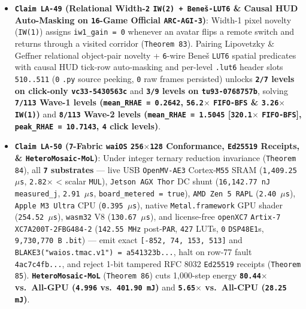 \documentclass[10pt]{article}
\begin{document}
\begin{itemize}
  \item \textbf{\texttt{Claim LA-49} (Relational Width-\texttt{2} \texttt{IW(2) + Bene\v{s}-LUT6} \& Causal HUD Auto-Masking on \texttt{16}-Game Official \texttt{ARC-AGI-3})}: Width-1 pixel novelty (\texttt{IW(1)}) assigns \texttt{iw1\_gain = 0} whenever an avatar flips a remote switch and returns through a visited corridor (\texttt{Theorem 83}). Pairing Lipovetzky \& Geffner relational object-pair novelty + \texttt{6}-wire Bene\v{s} \texttt{LUT6} spatial predicates with causal HUD tick-row auto-masking and per-level \texttt{.lut6} header slots \texttt{510..511} (\texttt{0} \texttt{.py} source peeking, \texttt{0} raw frames persisted) unlocks \textbf{\texttt{2/7} levels on click-only \texttt{vc33-5430563c}} and \textbf{\texttt{3/9} levels on \texttt{tu93-0768757b}}, solving \textbf{\texttt{7/113} Wave-1 levels (\texttt{mean\_RHAE = 0.2642}, \texttt{56.2$\times$} \texttt{FIFO-BFS} \& \texttt{3.26$\times$} \texttt{IW(1)})} and \textbf{\texttt{8/113} Wave-2 levels (\texttt{mean\_RHAE = 1.5045} [\texttt{320.1$\times$} \texttt{FIFO-BFS}], \texttt{peak\_RHAE = 10.7143}, \texttt{4} click levels)}.
  \item \textbf{\texttt{Claim LA-50} (\texttt{7}-Fabric \texttt{waiOS} \texttt{256$\times$128} Conformance, \texttt{Ed25519} Receipts, \& \texttt{HeteroMosaic-MoL})}: Under integer ternary reduction invariance (\texttt{Theorem 84}), all \textbf{\texttt{7} substrates} --- live USB \texttt{OpenMV-AE3} Cortex-\texttt{M55} SRAM (\texttt{1,409.25 $\mu$s}, \texttt{2.82$\times$} < scalar \texttt{MUL}), \texttt{Jetson AGX Thor} DC shunt (\texttt{16,142.77 nJ} \texttt{measured\_j}, \texttt{2.91 $\mu$s}, \texttt{board\_metered = true}), \texttt{AMD Zen 5 RAPL} (\texttt{2.40 $\mu$s}), \texttt{Apple M3 Ultra} CPU (\texttt{0.395 $\mu$s}), native \texttt{Metal.framework} GPU shader (\texttt{254.52 $\mu$s}), \texttt{wasm32} V8 (\texttt{130.67 $\mu$s}), and license-free \texttt{openXC7} \texttt{Artix-7 XC7A200T-2FBG484-2} (\texttt{142.55 MHz} post-\texttt{PAR}, \texttt{427} LUTs, \texttt{0} \texttt{DSP48E1}s, \texttt{9,730,770 B} \texttt{.bit}) --- emit exact \texttt{[-852, 74, 153, 513]} and \texttt{BLAKE3("waios.tmac.v1") = a541323b...}, halt on row-77 fault \texttt{4ac7c4fb...}, and reject 1-bit tampered RFC 8032 \texttt{Ed25519} receipts (\texttt{Theorem 85}). \textbf{\texttt{HeteroMosaic-MoL}} (\texttt{Theorem 86}) cuts 1,000-step energy \textbf{\texttt{80.44$\times$} vs.\ All-GPU (\texttt{4.996} vs.\ \texttt{401.90 mJ})} and \textbf{\texttt{5.65$\times$} vs.\ All-CPU (\texttt{28.25 mJ})}.

\end{itemize}
\end{document}
